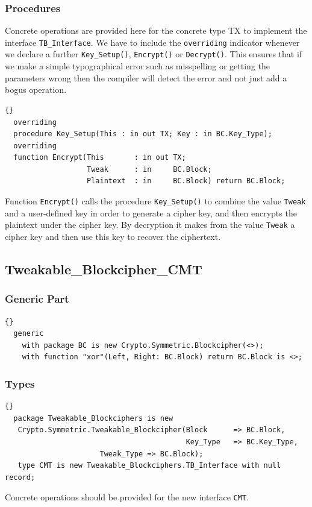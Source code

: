 \subsubsection*{Procedures}
Concrete operations are provided here for the concrete type TX to
implement the interface \texttt{TB\_Interface}.  We have to include
the \texttt{overriding} indicator whenever we declare a further
\texttt{Key\_Setup()}, \texttt{Encrypt()} or \texttt{Decrypt()}. This
ensures that if we make a simple typographical error such as
misspelling or getting the parameters wrong then the compiler will
detect the error and not just add a bogus operation.
\begin{lstlisting}{}
  overriding
  procedure Key_Setup(This : in out TX; Key : in BC.Key_Type);
  overriding
  function Encrypt(This       : in out TX;
                   Tweak      : in     BC.Block;
                   Plaintext  : in     BC.Block) return BC.Block;
\end{lstlisting}
Function \texttt{Encrypt()} calls the procedure \texttt{Key\_Setup()}
to combine the value \texttt{Tweak} and a user-defined key in order to
generate a cipher key, and then encrypts the plaintext under the
cipher key. By decryption it makes from the value \texttt{Tweak} a
cipher key and then use this key to recover the ciphertext.


\subsection*{Tweakable\_Blockcipher\_CMT}
\subsubsection*{Generic Part}
\begin{lstlisting}{}
  generic
    with package BC is new Crypto.Symmetric.Blockcipher(<>);
    with function "xor"(Left, Right: BC.Block) return BC.Block is <>;
\end{lstlisting}
\subsubsection*{Types}
\begin{lstlisting}{}
  package Tweakable_Blockciphers is new
   Crypto.Symmetric.Tweakable_Blockcipher(Block      => BC.Block,
                                          Key_Type   => BC.Key_Type,
					  Tweak_Type => BC.Block);
   type CMT is new Tweakable_Blockciphers.TB_Interface with null record;
\end{lstlisting}
Concrete operations should be provided for the new interface \texttt{CMT}.
